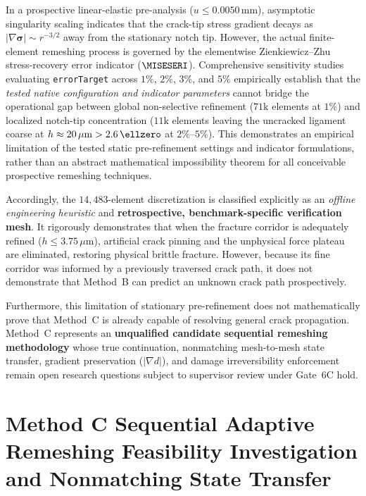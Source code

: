 \begin{enumerate}
In a prospective linear-elastic pre-analysis ($u \le 0.0050\,\mathrm{mm}$), asymptotic singularity scaling indicates that the crack-tip stress gradient decays as $|\nabla \boldsymbol{\sigma}| \sim r^{-3/2}$ away from the stationary notch tip. However, the actual finite-element remeshing process is governed by the elementwise Zienkiewicz--Zhu stress-recovery error indicator ($\MISESERI$). Comprehensive sensitivity studies evaluating \texttt{errorTarget} across $1\%$, $2\%$, $3\%$, and $5\%$ empirically establish that the \emph{tested native configuration and indicator parameters} cannot bridge the operational gap between global non-selective refinement ($71\mathrm{k}$ elements at $1\%$) and localized notch-tip concentration ($11\mathrm{k}$ elements leaving the uncracked ligament coarse at $h \approx 20\,\mu\mathrm{m} > 2.6\,\ellzero$ at $2\%$--$5\%$). This demonstrates an empirical limitation of the tested static pre-refinement settings and indicator formulations, rather than an abstract mathematical impossibility theorem for all conceivable prospective remeshing techniques.

Accordingly, the $14{,}483$-element discretization is classified explicitly as an \emph{offline engineering heuristic} and \textbf{retrospective, benchmark-specific verification mesh}. It rigorously demonstrates that when the fracture corridor is adequately refined ($h \le 3.75\,\mu\mathrm{m}$), artificial crack pinning and the unphysical force plateau are eliminated, restoring physical brittle fracture. However, because its fine corridor was informed by a previously traversed crack path, it does not demonstrate that Method~B can predict an unknown crack path prospectively. 

Furthermore, this limitation of stationary pre-refinement does not mathematically prove that Method~C is already capable of resolving general crack propagation. Method~C represents an \textbf{unqualified candidate sequential remeshing methodology} whose true continuation, nonmatching mesh-to-mesh state transfer, gradient preservation ($|\nabla d|$), and damage irreversibility enforcement remain open research questions subject to supervisor review under Gate~6C hold.


\section{Method C Sequential Adaptive Remeshing Feasibility Investigation and Nonmatching State Transfer}
\label{sec:method_c_state_transfer}


\end{enumerate}

